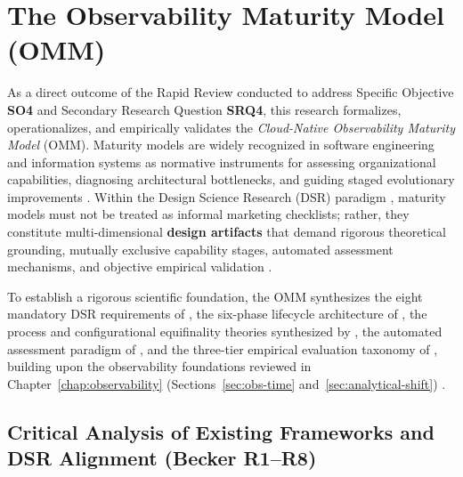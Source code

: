 \section{The Observability Maturity Model (OMM)}
\label{sec:omm}

As a direct outcome of the Rapid Review conducted to address Specific Objective \textbf{SO4} and Secondary Research Question \textbf{SRQ4}, this research formalizes, operationalizes, and empirically validates the \textit{Cloud-Native Observability Maturity Model} (OMM). Maturity models are widely recognized in software engineering and information systems as normative instruments for assessing organizational capabilities, diagnosing architectural bottlenecks, and guiding staged evolutionary improvements \cite{proenca_2016, adekunle_2022}. Within the Design Science Research (DSR) paradigm \cite{hevner_2004, peffers_2006}, maturity models must not be treated as informal marketing checklists; rather, they constitute multi-dimensional \textbf{design artifacts} that demand rigorous theoretical grounding, mutually exclusive capability stages, automated assessment mechanisms, and objective empirical validation \cite{mettler_2011, poppelbuss_2011, roglinger_2012, lasrado_2015}.

To establish a rigorous scientific foundation, the OMM synthesizes the eight mandatory DSR requirements of , the six-phase lifecycle architecture of , the process and configurational equifinality theories synthesized by  \cite{vandeven_1995, fiss_2011}, the automated assessment paradigm of , and the three-tier empirical evaluation taxonomy of , building upon the observability foundations reviewed in Chapter~\ref{chap:observability} (Sections~\ref{sec:obs-time} and~\ref{sec:analytical-shift}) \cite{kalman_1960, valbusa_2025, agarwal_2022, nethala_2025}.

\subsection{Critical Analysis of Existing Frameworks and DSR Alignment (Becker R1--R8)}
\label{subsec:omm-dsr-alignment}

